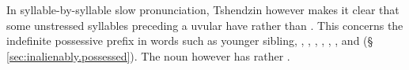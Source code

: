 In syllable-by-syllable slow pronunciation, Tshendzin however makes it clear that some unstressed syllables preceding a uvular have  rather than . This concerns the indefinite possessive prefix in words such as  {younger sibling}, , , , , , ,  and  (§ \ref{sec:inalienably.possessed}). The noun  however has  rather .

